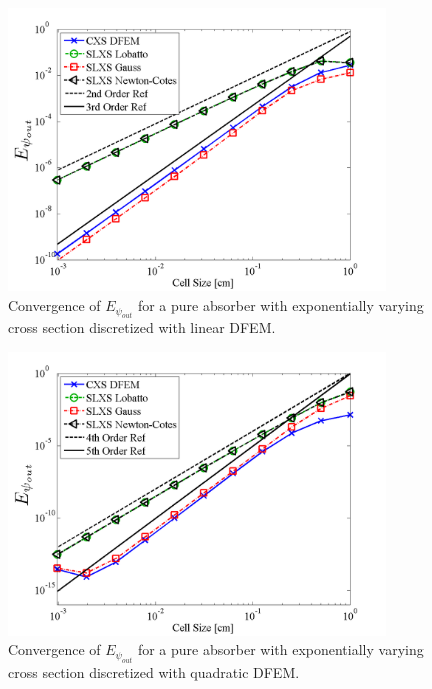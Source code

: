 %
\begin{figure}[!htp]
\centering
\includegraphics[width=10cm]{chapter3_variable_xs/P1_VarXS_E_psi_out.png}
\caption{Convergence of $E_{\psi_{out}}$  for a pure absorber with exponentially varying cross section discretized with linear DFEM.}
\label{fig:varxs_psi_out_p1}
\end{figure}
%
%
\begin{figure}[!hbp]
\centering
\includegraphics[width=10cm]{chapter3_variable_xs/P2_VarXS_E_psi_out.png}
\caption{Convergence of $E_{\psi_{out}}$  for a pure absorber with exponentially varying cross section discretized with quadratic DFEM.}
\label{fig:varxs_psi_out_p2}
\end{figure}
%




